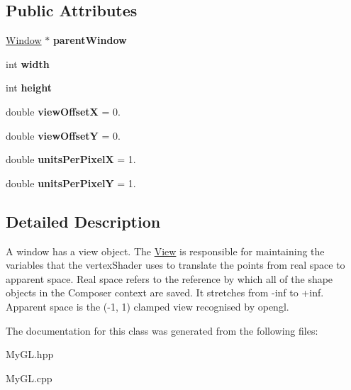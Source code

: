 \subsection*{Public Attributes}
\begin{DoxyCompactItemize}
\item 
\hypertarget{classView_ae047212bfa12abf0f0a57bf604e020ba}{}\hyperlink{classWindow}{Window} $\ast$ {\bfseries parent\+Window}\label{classView_ae047212bfa12abf0f0a57bf604e020ba}

\item 
\hypertarget{classView_ae039aa744b085db819ae149705b2c32b}{}int {\bfseries width}\label{classView_ae039aa744b085db819ae149705b2c32b}

\item 
\hypertarget{classView_a6e3e5c18893617490f02166641356746}{}int {\bfseries height}\label{classView_a6e3e5c18893617490f02166641356746}

\item 
\hypertarget{classView_a9b210244771d77ebcc08e5f9e9862922}{}double {\bfseries view\+Offset\+X} = 0.\label{classView_a9b210244771d77ebcc08e5f9e9862922}

\item 
\hypertarget{classView_ae18f735f6c322277e5788fa56bb9c758}{}double {\bfseries view\+Offset\+Y} = 0.\label{classView_ae18f735f6c322277e5788fa56bb9c758}

\item 
\hypertarget{classView_ad2318a59fa2280eab8b7a59d317f4e5a}{}double {\bfseries units\+Per\+Pixel\+X} = 1.\label{classView_ad2318a59fa2280eab8b7a59d317f4e5a}

\item 
\hypertarget{classView_a28db7efdb0540ef7cdc49934ecb79893}{}double {\bfseries units\+Per\+Pixel\+Y} = 1.\label{classView_a28db7efdb0540ef7cdc49934ecb79893}

\end{DoxyCompactItemize}


\subsection{Detailed Description}
A window has a view object. The \hyperlink{classView}{View} is responsible for maintaining the variables that the vertex\+Shader uses to translate the points from real space to apparent space. Real space refers to the reference by which all of the shape objects in the Composer context are saved. It stretches from -\/inf to +inf. Apparent space is the (-\/1, 1) clamped view recognised by opengl. 

The documentation for this class was generated from the following files\+:\begin{DoxyCompactItemize}
\item 
My\+G\+L.\+hpp\item 
My\+G\+L.\+cpp\end{DoxyCompactItemize}
